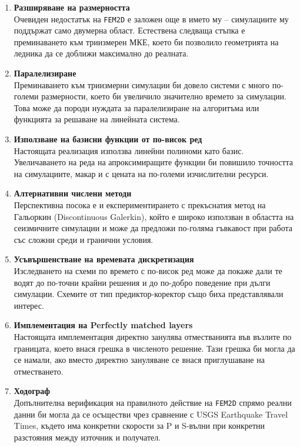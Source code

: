 \documentclass{report}
\begin{document}
	\begin{enumerate}
		\item \textbf{Разширяване на размерността} \\
		Очевиден недостатък на \texttt{FEM2D} е заложен още в името му – симулациите му поддържат само двумерна област. Естествена следваща стъпка е преминаването към триизмерен МКЕ, 
		което би позволило геометрията на ледника да се доближи максимално до реалната.

		\item \textbf{Паралелизиране} \\
		Преминаването към триизмерни симулации би довело системи с много по-големи размерности, което би увеличило значително времето за симулации. Това може да породи нуждата за паралелизиране на 
		алгоритъма или функцията за решаване на линейната система.

		\item \textbf{Използване на базисни функции от по-висок ред} \\
		Настоящата реализация използва линейни полиноми като базис. Увеличаването на реда на апроксимиращите функции би повишило точността на симулациите, макар и с цената на по-големи изчислителни ресурси.
		
		\item \textbf{Алтернативни числени методи} \\
		Перспективна посока е и експериментирането с прекъснатия метод на Гальоркин (Discontinuous Galerkin), който е широко използван в областта на сеизмичните симулации и може да предложи 
		по-голяма гъвкавост при работа със сложни среди и гранични условия.

		\item \textbf{Усъвършенстване на времевата дискретизация} \\
		Изследването на схеми по времето с по-висок ред може да покаже дали те водят до по-точни крайни решения и до по-добро поведение при дълги симулации. Схемите от тип предиктор-коректор също биха представлявали интерес.
		
		\item \textbf{Имплементация на Perfectly matched layers} \\
		Настоящата имплементация директно занулява отместванията във възлите по границата, което внася грешка в численото решение. Тази грешка би могла да се намали, ако вместо директно зануляване се внася приглушаване на отместването.
		
		\item \textbf{Ходограф} \\
		Допълнителна верификация на правилното действие на \texttt{FEM2D} спрямо реални данни би могла да се осъществи чрез сравнение с USGS Earthquake Travel Times, където има конкретни скорости за P и S-вълни при конкретни разстояния между източник и получател.
		

\end{enumerate}
\end{document}
